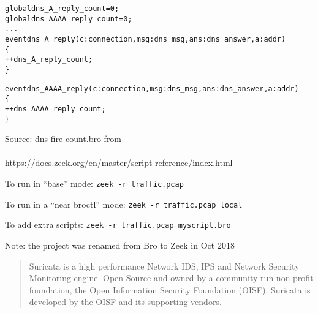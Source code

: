 \documentclass[Screen16to9,17pt]{foils}
\begin{document}



\begin{alltt}\small
global dns_A_reply_count=0;
global dns_AAAA_reply_count=0;
...
event dns_A_reply(c: connection, msg: dns_msg, ans: dns_answer, a: addr)
        \{
        ++dns_A_reply_count;
        \}

event dns_AAAA_reply(c: connection, msg: dns_msg, ans: dns_answer, a: addr)
        \{
        ++dns_AAAA_reply_count;
        \}
\end{alltt}
Source: dns-fire-count.bro from\\
{\footnotesize {}\\
\url{https://docs.zeek.org/en/master/script-reference/index.html}}



\begin{list1}
\item To run in “base” mode:
 \verb+zeek -r traffic.pcap+
\item To run in a “near broctl” mode:
\verb+zeek -r traffic.pcap local+
\item To add extra scripts:
\verb+zeek -r traffic.pcap myscript.bro+
\end{list1}

\centerline{Note: the project was renamed from Bro to Zeek in Oct 2018}




\begin{quote}
Suricata is a high performance Network IDS, IPS and Network Security Monitoring engine. Open Source and owned by a community run non-profit foundation, the Open Information Security Foundation (OISF). Suricata is developed by the OISF and its supporting vendors.
\end{quote}



\end{document}
